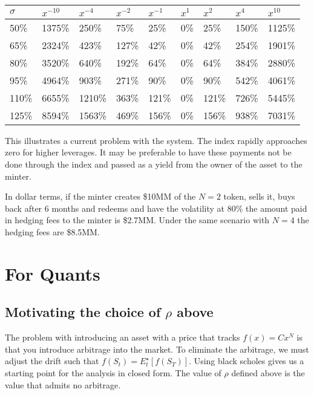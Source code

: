 \documentclass[12pt]{article}
\begin{document}
    \begin{center}
        \begin{tabular}{l||l|l|l|l|l|l|l|l}
            $\sigma$ & $x^{-10}$ & $x^{-4}$ & $x^{-2}$ & $x^{-1}$ & $x^{1}$ & $x^{2}$ & $x^{4}$ & $x^{10}$ \\ \hline \hline
            50\%     & 1375\%    & 250\%    & 75\%     & 25\%     & 0\%     & 25\%    & 150\%   & 1125\%   \\ \hline
            65\%     & 2324\%    & 423\%    & 127\%    & 42\%     & 0\%     & 42\%    & 254\%   & 1901\%   \\ \hline
            80\%     & 3520\%    & 640\%    & 192\%    & 64\%     & 0\%     & 64\%    & 384\%   & 2880\%   \\ \hline
            95\%     & 4964\%    & 903\%    & 271\%    & 90\%     & 0\%     & 90\%    & 542\%   & 4061\%   \\ \hline
            110\%    & 6655\%    & 1210\%   & 363\%    & 121\%    & 0\%     & 121\%   & 726\%   & 5445\%   \\ \hline
            125\%    & 8594\%    & 1563\%   & 469\%    & 156\%    & 0\%     & 156\%   & 938\%   & 7031\%
        \end{tabular}
    \end{center}

    This illustrates a current problem with the system. The index rapidly approaches zero for higher leverages. It may be preferable to have these payments not be done through the index and passed as a yield from the owner of the asset to the minter.

    In dollar terms, if the minter creates \$10MM of the $N=2$ token, sells it, buys back after 6 months and redeems and have the volatility at 80\% the amount paid in hedging fees to the minter is \$2.7MM. Under the same scenario with $N=4$ the hedging fees are \$8.5MM.


    \section{For Quants}

    \subsection{Motivating the choice of $\rho$ above}
    The problem with introducing an asset with a price that tracks $f(x) = C x^N$ is that you introduce arbitrage into the market. To eliminate the arbitrage, we must adjust the drift such that $f(S_t) = E_t^\star[ f(S_T) ] $. Using black scholes gives us a starting point for the analysis in closed form. The value of $\rho$ defined above is the value that admits no arbitrage.
\end{document}
